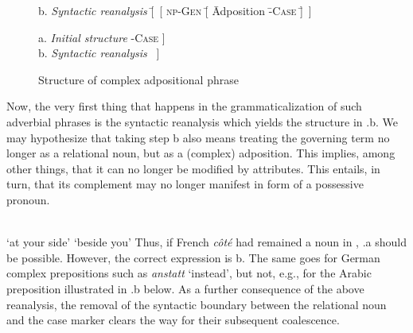\begin{figure}
	\begin{tabbing}
		b. \hspace{.75cm} \= \textit{Syntactic reanalysis} \hspace{1cm} \= [~[ \= \textsc{np}-\textsc{Gen} \= [ \= Adposition \= -\textsc{Case} \= ]~]\kill
		
		a.	\>	\textit{Initial structure}	\> [~[ \>  \textsc{np}-\textsc{Gen} \> \>  N\textsubscript{rel} ] \>  {}-\textsc{Case} \> ] \\
		b. \> \textit{Syntactic reanalysis} \> [ \> \textsc{np}-\textsc{Gen} \> [ \> Adposition \> -\textsc{Case} \> ]~]
	\end{tabbing}
	\caption{Structure of complex adpositional phrase} \label{fig:structureadpos}
\end{figure}

\noindent Now, the very first thing that happens in the grammaticalization of such adverbial phrases is the syntactic reanalysis which yields the structure in .b. We may hypothesize that taking step b also means treating the governing term no longer as a relational noun, but as a (complex) adposition. This implies, among other things, that it can no longer be modified by attributes. This entails, in turn, that its complement may no longer manifest in form of a possessive pronoun.

\ea\label{ex:E53}
\langinfo{\LangFren}{}{} \\
\glt  ‘at your side’
  \glt ‘beside you’
 \z
\z
\noindent Thus, if French \textit{côté} had remained a noun in , .a should be possible. However, the correct expression is b. The same goes for German complex prepositions such as \textit{anstatt} ‘instead’, but not, e.g., for the Arabic preposition illustrated in .b below. As a further consequence of the above reanalysis, the removal of the syntactic boundary between the relational noun and the case marker clears the way for their subsequent coalescence.

